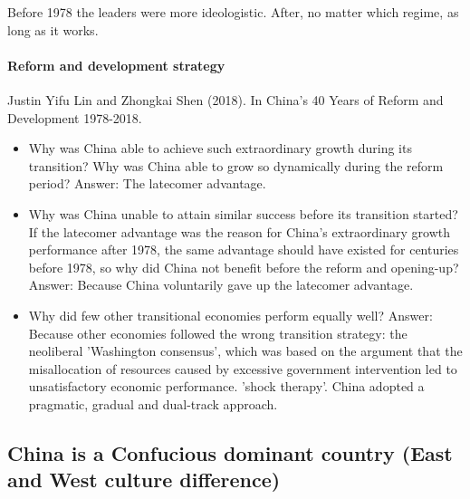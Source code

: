 Before 1978 the leaders were more ideologistic. After, no matter which
regime, as long as it works.

\paragraph{Reform and development strategy}
Justin Yifu Lin and Zhongkai Shen (2018). In China's 40 Years of Reform and
Development 1978-2018.
\begin{itemize}
    \item Why was China able to achieve such extraordinary growth during
        its transition? Why was China able to grow so dynamically during the
        reform period? Answer: The latecomer advantage.
    \item Why was China unable to attain similar success before its
        transition started? If the latecomer advantage was the reason
        for China's extraordinary growth performance after 1978, the same
        advantage should have existed for centuries before 1978, so why did
        China not benefit before the reform and opening-up? Answer: Because
        China voluntarily gave up the latecomer advantage.
    \item Why did few other transitional economies perform equally well?
        Answer: Because other economies followed the wrong transition strategy:
        the neoliberal 'Washington consensus', which was based on the argument
        that the misallocation of resources caused by excessive government
        intervention led to unsatisfactory economic performance. 'shock therapy'.
        China adopted a pragmatic, gradual and dual-track approach.
\end{itemize}

\subsection{China is a Confucious dominant country (East and West culture difference)}

